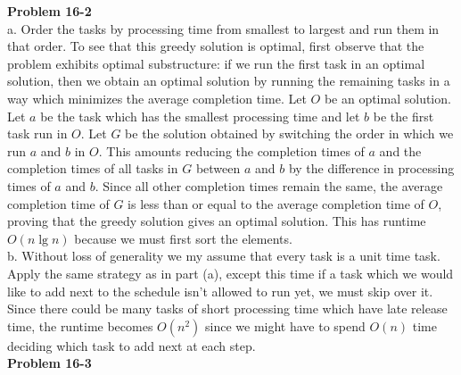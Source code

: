 \documentclass{article}
\begin{document}
\noindent\textbf{Problem 16-2}\\

a. Order the tasks by processing time from smallest to largest and run them in that order.  To see that this greedy solution is optimal, first observe that the problem exhibits optimal substructure: if we run the first task in an optimal solution, then we obtain an optimal solution by running the remaining tasks in a way which minimizes the average completion time.  Let $O$ be an optimal solution.  Let $a$ be the task which has the smallest processing time and let $b$ be the first task run in $O$.  Let $G$ be the solution obtained by switching the order in which we run $a$ and $b$ in $O$.  This amounts reducing the completion times of $a$ and the completion times of all tasks in $G$ between $a$ and $b$ by the difference in processing times of $a$ and $b$.  Since all other completion times remain the same, the average completion time of $G$ is less than or equal to the average completion time of $O$, proving that the greedy solution gives an optimal solution. This has runtime $O(n\lg n)$ because we must first sort the elements.\\

b. Without loss of generality we my assume that every task is a unit time task.  Apply the same strategy as in part (a), except this time if a task which we would like to add next to the schedule isn't allowed to run yet, we must skip over it.  Since there could be many tasks of short processing time which have late release time, the runtime becomes $O(n^2)$ since we might have to spend $O(n)$ time deciding which task to add next at each step. \\

\noindent\textbf{Problem 16-3}\\
\end{document}
